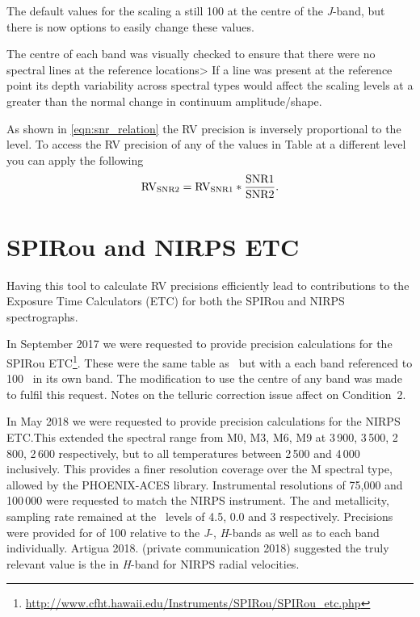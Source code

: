 The default values for the \snr{} scaling a still 100 at the centre of the \textit{J}-band, but there is now options to easily change these values.

The centre of each band was visually checked to ensure that there were no spectral lines at the reference locations> If a line was present at the reference point its depth variability across spectral types would affect the \snr{} scaling levels at a greater than the normal change in continuum amplitude/shape.

As shown in \cref{eqn:snr_relation} the {RV} precision is inversely proportional to the \snr{} level.
To access the {RV} precision of any of the values in Table at a different \snr{} level you can apply the following
\begin{equation}
\rm RV_{\textrm{SNR}{}2} = RV_{\textrm{SNR}{}1} * \frac{\textrm{SNR}{}1}{\textrm{SNR}{}2}.
\end{equation}

\section{{SPIRou} and {NIRPS} {ETC}}\label{sec:spirou_nirps_etc}
Having this tool to calculate {RV} precisions efficiently lead to contributions to the Exposure Time Calculators (ETC) for both the {SPIRou} and {NIRPS} spectrographs.

In September 2017 we were requested to provide precision calculations for the {SPIRou} ETC\footnote{\url{http://www.cfht.hawaii.edu/Instruments/SPIRou/SPIRou_etc.php}}.
These were the same table as~\citet{figueira_radial_2016} but with a each band referenced to 100~{\snr{}} in its own band.
The modification to use the centre of any band was made to fulfil this request.
Notes on the telluric correction issue affect on Condition~2.

In May 2018 we were requested to provide precision calculations for the {NIRPS} {ETC}.\@ This extended the spectral range from {M0}, {M3}, {M6}, {M9} at 3\,900, 3\,500, 2\,800, 2\,600\K{} respectively, but to all temperatures between 2\,500 and 4\,000\K{} inclusively.
This provides a finer resolution coverage over the M spectral type, allowed by the {PHOENIX-ACES} library.
Instrumental resolutions of 75,000 and 100\,000 were requested to match the {NIRPS} instrument.
The \logg{} and metallicity, sampling rate remained at the~\citet{figueira_radial_2016} levels of 4.5, 0.0 and 3 respectively.
Precisions were provided for \snr{} of 100 relative to the \emph{J}-, \emph{H}-bands as well as to each band individually.
Artigua 2018. (private communication 2018)  suggested the truly relevant value is the \snr{} in \emph{H}-band for {NIRPS} radial velocities.

